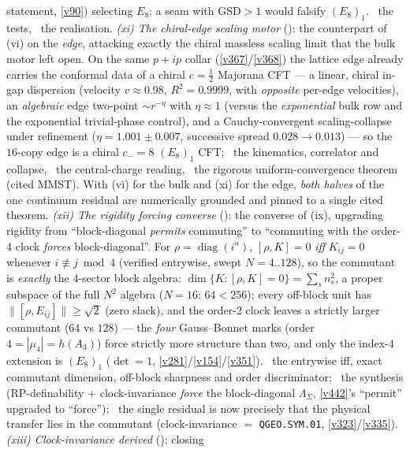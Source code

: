 statement, \vref{v90}) selecting $E_8$; a seam with GSD${>}1$ would falsify $(E_8)_1$. \mX\ the tests, \mO\ the
realisation. \emph{(xi) The chiral-edge scaling motor} (): the counterpart of
(vi) on the \emph{edge}, attacking exactly the chiral massless scaling limit that the bulk motor left open. On the
same $p{+}ip$ collar (\vref{v367}/\vref{v368}) the lattice edge already carries the conformal data of a chiral
$c{=}\tfrac12$ Majorana CFT --- a linear, chiral in-gap dispersion (velocity $v{\approx}0.98$, $R^2{=}0.9999$, with
\emph{opposite} per-edge velocities), an \emph{algebraic} edge two-point $\sim r^{-\eta}$ with $\eta{\approx}1$
(versus the \emph{exponential} bulk row and the exponential trivial-phase control), and a Cauchy-convergent
scaling-collapse under refinement ($\eta{=}1.001{\pm}0.007$, successive spread $0.028{\to}0.013$) --- so the
$16$-copy edge is a chiral $c_-{=}8$ $(E_8)_1$ CFT; \mE\ the kinematics, correlator and collapse, \mC\ the
central-charge reading, \mO\ the rigorous uniform-convergence theorem (cited MMST). With (vi) for the bulk and
(xi) for the edge, \emph{both halves} of the one continuum residual are numerically grounded and pinned to a single
cited theorem. \emph{(xii) The rigidity forcing converse} (): the converse
of (ix), upgrading rigidity from ``block-diagonal \emph{permits} commuting'' to ``commuting with the order-$4$
clock \emph{forces} block-diagonal''. For $\rho{=}\operatorname{diag}(i^n)$, $[\rho,K]{=}0$ \emph{iff}
$K_{ij}{=}0$ whenever $i{\not\equiv}j\bmod4$ (verified entrywise, swept $N{=}4..128$), so the commutant is
\emph{exactly} the $4$-sector block algebra: $\dim\{K:[\rho,K]{=}0\}{=}\sum_s n_s^2$, a proper subspace of the
full $N^2$ algebra ($N{=}16$: $64{<}256$); every off-block unit has $\|[\rho,E_{ij}]\|{\ge}\sqrt2$ (zero slack),
and the order-$2$ clock leaves a strictly larger commutant ($64$ vs $128$) --- the \emph{four} Gauss--Bonnet marks
(order $4{=}|\mu_4|{=}h(A_3)$) force strictly more structure than two, and only the index-$4$ extension is $(E_8)_1$
($\det{=}1$, \vref{v281}/\vref{v154}/\vref{v351}). \mE\ the entrywise iff, exact commutant dimension, off-block
sharpness and order discriminator; \mC\ the synthesis (RP-definability $+$ clock-invariance \emph{force} the
block-diagonal $\Lambda_\Sigma$, \vref{v442}'s ``permit'' upgraded to ``force''); \mO\ the single residual is now
precisely that the physical transfer lies in the commutant (clock-invariance $=$ \texttt{QGEO.SYM.01},
\vref{v323}/\vref{v335}). \emph{(xiii) Clock-invariance derived} (): closing
